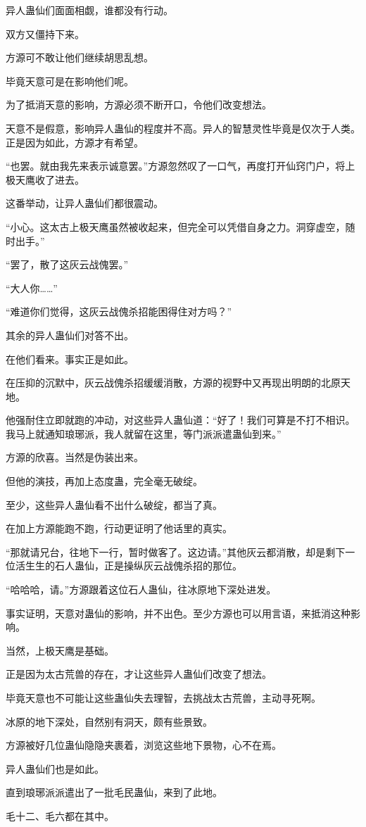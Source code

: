 \begin{this_body}
异人蛊仙们面面相觑，谁都没有行动。

双方又僵持下来。

方源可不敢让他们继续胡思乱想。

毕竟天意可是在影响他们呢。

为了抵消天意的影响，方源必须不断开口，令他们改变想法。

天意不是假意，影响异人蛊仙的程度并不高。异人的智慧灵性毕竟是仅次于人类。正是因为如此，方源才有希望。

“也罢。就由我先来表示诚意罢。”方源忽然叹了一口气，再度打开仙窍门户，将上极天鹰收了进去。

这番举动，让异人蛊仙们都很震动。

“小心。这太古上极天鹰虽然被收起来，但完全可以凭借自身之力。洞穿虚空，随时出手。”

“罢了，散了这灰云战傀罢。”

“大人你……”

“难道你们觉得，这灰云战傀杀招能困得住对方吗？”

其余的异人蛊仙们对答不出。

在他们看来。事实正是如此。

在压抑的沉默中，灰云战傀杀招缓缓消散，方源的视野中又再现出明朗的北原天地。

他强耐住立即就跑的冲动，对这些异人蛊仙道：“好了！我们可算是不打不相识。我马上就通知琅琊派，我人就留在这里，等门派派遣蛊仙到来。”

方源的欣喜。当然是伪装出来。

但他的演技，再加上态度蛊，完全毫无破绽。

至少，这些异人蛊仙看不出什么破绽，都当了真。

在加上方源能跑不跑，行动更证明了他话里的真实。

“那就请兄台，往地下一行，暂时做客了。这边请。”其他灰云都消散，却是剩下一位活生生的石人蛊仙，正是操纵灰云战傀杀招的那位。

“哈哈哈，请。”方源跟着这位石人蛊仙，往冰原地下深处进发。

事实证明，天意对蛊仙的影响，并不出色。至少方源也可以用言语，来抵消这种影响。

当然，上极天鹰是基础。

正是因为太古荒兽的存在，才让这些异人蛊仙们改变了想法。

毕竟天意也不可能让这些蛊仙失去理智，去挑战太古荒兽，主动寻死啊。

冰原的地下深处，自然别有洞天，颇有些景致。

方源被好几位蛊仙隐隐夹裹着，浏览这些地下景物，心不在焉。

异人蛊仙们也是如此。

直到琅琊派派遣出了一批毛民蛊仙，来到了此地。

毛十二、毛六都在其中。

\end{this_body}

